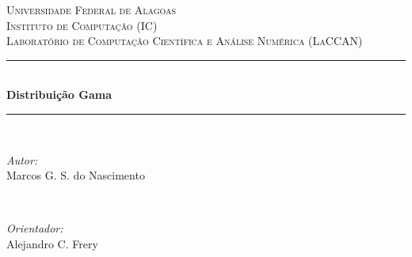 \begin{titlepage}

\newcommand{\HRule}{\rule{\linewidth}{0.5mm}} %

\center %
 

\textsc{\LARGE Universidade Federal de Alagoas}\\[1.5cm] %
\textsc{\Large Instituto de Computação (IC)}\\[0.5cm] %
\textsc{\large Laboratório de Computação Científica e Análise Numérica (LaCCAN)}\\[0.5cm] %


\HRule \\[0.4cm]
{ \LARGE \bfseries Distribuição Gama}\\[0.4cm] %
\HRule \\[1.5cm]
 

\begin{minipage}{0.4\textwidth}
\begin{flushleft} \large
\emph{Autor:}\\
Marcos G. S. do Nascimento %
\end{flushleft}
\end{minipage}
~
\begin{minipage}{0.4\textwidth}
\begin{flushright} \large
\emph{Orientador:} \\
Alejandro C. Frery  %
\end{flushright}
\end{minipage}\\[2cm]



\end{titlepage}

